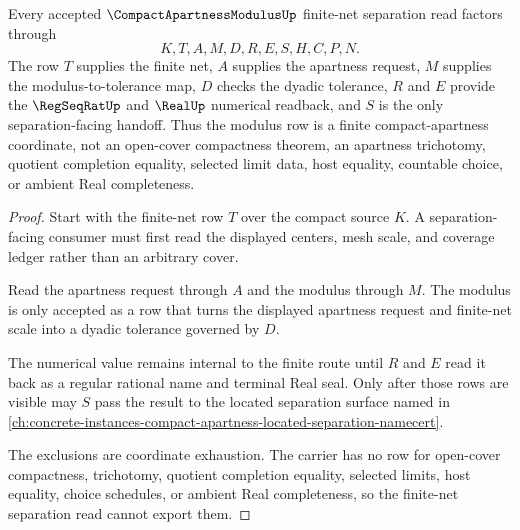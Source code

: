 \begin{theorem}
\label{thm:compact-apartness-modulus-finite-net-separation}
Every accepted $\CompactApartnessModulusUp$ finite-net separation read factors through
$$
K,T,A,M,D,R,E,S,H,C,P,N.
$$
The row $T$ supplies the finite net, $A$ supplies the apartness request, $M$ supplies the modulus-to-tolerance map, $D$ checks the dyadic tolerance, $R$ and $E$ provide the $\RegSeqRatUp$ and $\RealUp$ numerical readback, and $S$ is the only separation-facing handoff. Thus the modulus row is a finite compact-apartness coordinate, not an open-cover compactness theorem, an apartness trichotomy, quotient completion equality, selected limit data, host equality, countable choice, or ambient Real completeness.
\end{theorem}
\begin{proof}
Start with the finite-net row $T$ over the compact source $K$. A separation-facing consumer must first read the displayed centers, mesh scale, and coverage ledger rather than an arbitrary cover.

Read the apartness request through $A$ and the modulus through $M$. The modulus is only accepted as a row that turns the displayed apartness request and finite-net scale into a dyadic tolerance governed by $D$.

The numerical value remains internal to the finite route until $R$ and $E$ read it back as a regular rational name and terminal Real seal. Only after those rows are visible may $S$ pass the result to the located separation surface named in \autoref{ch:concrete-instances-compact-apartness-located-separation-namecert}.

The exclusions are coordinate exhaustion. The carrier has no row for open-cover compactness, trichotomy, quotient completion equality, selected limits, host equality, choice schedules, or ambient Real completeness, so the finite-net separation read cannot export them.
\end{proof}



